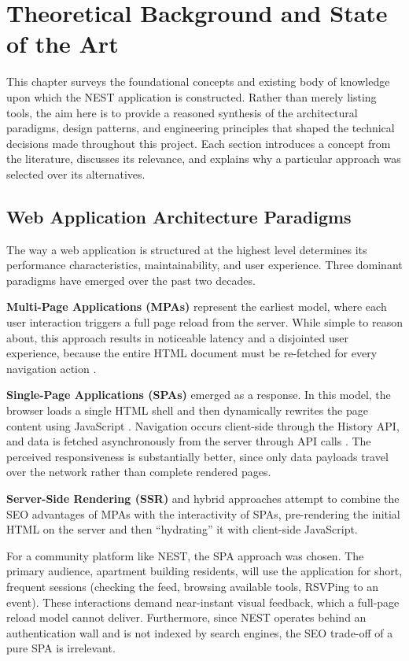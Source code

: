 \chapter{Theoretical Background and State of the Art}
\label{chap:theoretical-background}

This chapter surveys the foundational concepts and existing body of knowledge upon which the NEST application is constructed. Rather than merely listing tools, the aim here is to provide a reasoned synthesis of the architectural paradigms, design patterns, and engineering principles that shaped the technical decisions made throughout this project. Each section introduces a concept from the literature, discusses its relevance, and explains why a particular approach was selected over its alternatives.

\section{Web Application Architecture Paradigms}

The way a web application is structured at the highest level determines its performance characteristics, maintainability, and user experience. Three dominant paradigms have emerged over the past two decades.

\textbf{Multi-Page Applications (MPAs)} represent the earliest model, where each user interaction triggers a full page reload from the server. While simple to reason about, this approach results in noticeable latency and a disjointed user experience, because the entire HTML document must be re-fetched for every navigation action \cite{mdnMPA}.

\textbf{Single-Page Applications (SPAs)} emerged as a response. In this model, the browser loads a single HTML shell and then dynamically rewrites the page content using JavaScript \cite{mdnSPA}. Navigation occurs client-side through the History API, and data is fetched asynchronously from the server through API calls \cite{angularDocs}. The perceived responsiveness is substantially better, since only data payloads travel over the network rather than complete rendered pages.

\textbf{Server-Side Rendering (SSR)} and hybrid approaches attempt to combine the SEO advantages of MPAs with the interactivity of SPAs, pre-rendering the initial HTML on the server and then ``hydrating'' it with client-side JavaScript.

For a community platform like NEST, the SPA approach was chosen. The primary audience, apartment building residents, will use the application for short, frequent sessions (checking the feed, browsing available tools, RSVPing to an event). These interactions demand near-instant visual feedback, which a full-page reload model cannot deliver. Furthermore, since NEST operates behind an authentication wall and is not indexed by search engines, the SEO trade-off of a pure SPA is irrelevant.


